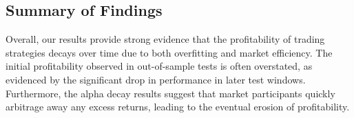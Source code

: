 \subsection{Summary of Findings}

Overall, our results provide strong evidence that the profitability of trading strategies decays over time due to both overfitting and market efficiency. The initial profitability observed in out-of-sample tests is often overstated, as evidenced by the significant drop in performance in later test windows. Furthermore, the alpha decay results suggest that market participants quickly arbitrage away any excess returns, leading to the eventual erosion of profitability.
